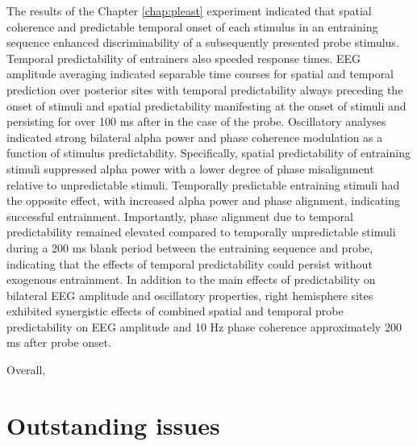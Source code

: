 \documentclass[dwyatte_dissertation.tex]{subfiles}
\begin{document}
The results of the Chapter \ref{chap:pleast} experiment indicated that spatial coherence and predictable temporal onset of each stimulus in an entraining sequence enhanced discriminability of a subsequently presented probe stimulus. Temporal predictability of entrainers also speeded response times. EEG amplitude averaging indicated separable time courses for spatial and temporal prediction over posterior sites with temporal predictability always preceding the onset of stimuli and spatial predictability manifesting at the onset of stimuli and persisting for over 100 ms after in the case of the probe. Oscillatory analyses indicated strong bilateral alpha power and phase coherence modulation as a function of stimulus predictability. Specifically, spatial predictability of entraining stimuli suppressed alpha power with a lower degree of phase misalignment relative to unpredictable stimuli. Temporally predictable entraining stimuli had the opposite effect, with increased alpha power and phase alignment, indicating successful entrainment. Importantly, phase alignment due to temporal predictability remained elevated compared to temporally unpredictable stimuli during a 200 ms blank period between the entraining sequence and probe, indicating that the effects of temporal predictability could persist without exogenous entrainment. In addition to the main effects of predictability on bilateral EEG amplitude and oscillatory properties, right hemisphere sites exhibited synergistic effects of combined spatial and temporal probe predictability on EEG amplitude and 10 Hz phase coherence approximately 200 ms after probe onset. 

Overall, 

\section{Outstanding issues}



%
%
\end{document}
